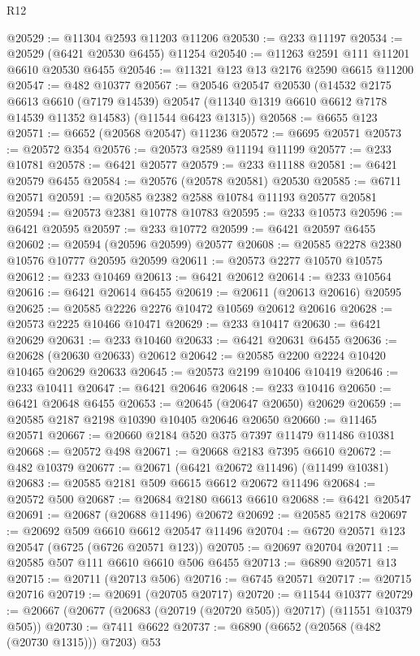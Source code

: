 \begin{lexlean}{R12}
\begin{coremodule}
@20529 := @11304 @2593 @11203 @11206
@20530 := @233 @11197
@20534 := @20529 (@6421 @20530 @6455) @11254
@20540 := @11263 @2591 @111 @11201 @6610 @20530 @6455
@20546 := @11321 @123 @13 @2176 @2590 @6615 @11200
@20547 := @482 @10377
@20567 := @20546
    @20547
    @20530
    (@14532
      @2175
      @6613
      @6610
      (@7179 @14539)
      @20547
      (@11340 @1319 @6610 @6612 @7178 @14539 @11352 @14583)
      (@11544 @6423 @1315))
@20568 := @6655 @123
@20571 := @6652 (@20568 @20547) @11236
@20572 := @6695 @20571
@20573 := @20572 @354
@20576 := @20573 @2589 @11194 @11199
@20577 := @233 @10781
@20578 := @6421 @20577
@20579 := @233 @11188
@20581 := @6421 @20579 @6455
@20584 := @20576 (@20578 @20581) @20530
@20585 := @6711 @20571
@20591 := @20585 @2382 @2588 @10784 @11193 @20577 @20581
@20594 := @20573 @2381 @10778 @10783
@20595 := @233 @10573
@20596 := @6421 @20595
@20597 := @233 @10772
@20599 := @6421 @20597 @6455
@20602 := @20594 (@20596 @20599) @20577
@20608 := @20585 @2278 @2380 @10576 @10777 @20595 @20599
@20611 := @20573 @2277 @10570 @10575
@20612 := @233 @10469
@20613 := @6421 @20612
@20614 := @233 @10564
@20616 := @6421 @20614 @6455
@20619 := @20611 (@20613 @20616) @20595
@20625 := @20585 @2226 @2276 @10472 @10569 @20612 @20616
@20628 := @20573 @2225 @10466 @10471
@20629 := @233 @10417
@20630 := @6421 @20629
@20631 := @233 @10460
@20633 := @6421 @20631 @6455
@20636 := @20628 (@20630 @20633) @20612
@20642 := @20585 @2200 @2224 @10420 @10465 @20629 @20633
@20645 := @20573 @2199 @10406 @10419
@20646 := @233 @10411
@20647 := @6421 @20646
@20648 := @233 @10416
@20650 := @6421 @20648 @6455
@20653 := @20645 (@20647 @20650) @20629
@20659 := @20585 @2187 @2198 @10390 @10405 @20646 @20650
@20660 := @11465 @20571
@20667 := @20660 @2184 @520 @375 @7397 @11479 @11486 @10381
@20668 := @20572 @498
@20671 := @20668 @2183 @7395 @6610
@20672 := @482 @10379
@20677 := @20671 (@6421 @20672 @11496) (@11499 @10381)
@20683 := @20585 @2181 @509 @6615 @6612 @20672 @11496
@20684 := @20572 @500
@20687 := @20684 @2180 @6613 @6610
@20688 := @6421 @20547
@20691 := @20687 (@20688 @11496) @20672
@20692 := @20585 @2178
@20697 := @20692 @509 @6610 @6612 @20547 @11496
@20704 := @6720 @20571 @123 @20547 (@6725 (@6726 @20571 @123))
@20705 := @20697 @20704
@20711 := @20585 @507 @111 @6610 @6610 @506 @6455
@20713 := @6890 @20571 @13
@20715 := @20711 (@20713 @506)
@20716 := @6745 @20571
@20717 := @20715 @20716
@20719 := @20691 (@20705 @20717)
@20720 := @11544 @10377
@20729 := @20667 (@20677 (@20683 (@20719 (@20720 @505)) @20717) (@11551 @10379 @505))
@20730 := @7411 @6622
@20737 := @6890 (@6652 (@20568 (@482 (@20730 @1315))) @7203) @53

\end{coremodule}
\end{lexlean}
